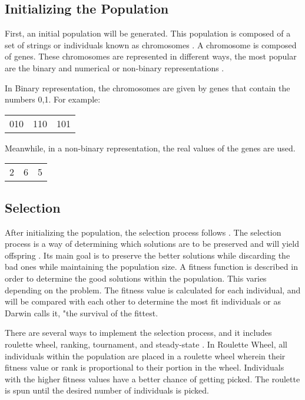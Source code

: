 \subsection{Initializing the Population}
\indent \indent First, an initial population will be generated. This population is composed of a set of strings or individuals known as chromosomes \cite{reeves2003genetic}. A chromosome is composed of genes. These chromosomes are represented in different ways, the most popular are the binary and numerical or non-binary representations \cite{gen2007genetic}. \par 

In Binary representation, the chromosomes are given by genes that contain the numbers {0,1}. For example: 
\begin{center}
	\begin{tabular}{ c c c }
		010 & 110 & 101 \\     
	\end{tabular}
\end{center}

\par 
Meanwhile, in a non-binary representation, the real values of the genes are used. 
\begin{center}
	\begin{tabular}{ c c c }
		2 & 6 & 5 \\     
	\end{tabular}
\end{center}


\subsection{Selection}
\indent \indent After initializing the population, the selection process follows \cite{maad2016genetic}. The selection process is a way of determining which solutions are to be preserved and will yield offspring \cite{bhattacharjya2012introduction} \cite{maad2016genetic}. Its main goal is to preserve the better solutions while discarding the bad ones while maintaining the population size. A fitness function is described in order to determine the good solutions within the population. This varies depending on the problem. The fitness value is calculated for each individual, and will be compared with each other to determine the most fit individuals or as Darwin calls it, "the survival of the fittest. \par 
There are several ways to implement the selection process, and it includes roulette wheel, ranking, tournament, and steady-state \cite{yadav2017comparative}. In Roulette Wheel, all individuals within the population are placed in a roulette wheel wherein their fitness value or rank is proportional to their portion in the wheel. Individuals with the higher fitness values have a better chance of getting picked. The roulette is spun until the desired number of individuals is picked.\par



